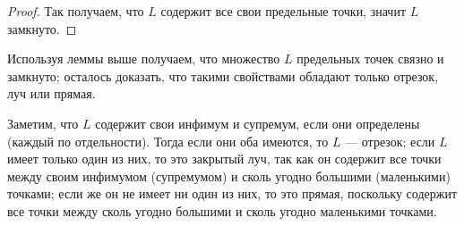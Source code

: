\documentclass[12pt,a4paper]{article}
\begin{document}
\begin{enumproblem}[\textcolor{green}{сдано}]
\begin{proof}
            Так получаем, что $L$ содержит все свои предельные точки, значит $L$ замкнуто.
        \end{proof}

        Используя леммы выше получаем, что множество $L$ предельных точек связно и замкнуто; осталось доказать, что такими свойствами обладают только отрезок, луч или прямая.

        Заметим, что $L$ содержит свои инфимум и супремум, если они определены (каждый по отдельности). Тогда если они оба имеются, то $L$ --- отрезок; если $L$ имеет только один из них, то это закрытый луч, так как он содержит все точки между своим инфимумом (супремумом) и сколь угодно большими (маленькими) точками; если же он не имеет ни один из них, то это прямая, поскольку содержит все точки между сколь угодно большими и сколь угодно маленькими точками.
    \end{enumproblem}
\end{document}
